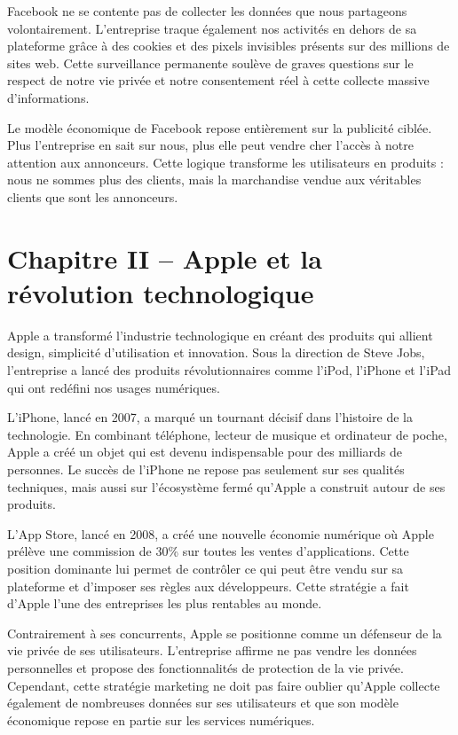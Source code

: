 \documentclass[12pt,a4paper]{article}
\begin{document}
Facebook ne se contente pas de collecter les données que nous partageons volontairement. L'entreprise traque également nos activités en dehors de sa plateforme grâce à des cookies et des pixels invisibles présents sur des millions de sites web. Cette surveillance permanente soulève de graves questions sur le respect de notre vie privée et notre consentement réel à cette collecte massive d'informations.

Le modèle économique de Facebook repose entièrement sur la publicité ciblée. Plus l'entreprise en sait sur nous, plus elle peut vendre cher l'accès à notre attention aux annonceurs. Cette logique transforme les utilisateurs en produits : nous ne sommes plus des clients, mais la marchandise vendue aux véritables clients que sont les annonceurs.

\newpage

\section*{Chapitre II -- Apple et la révolution technologique}

Apple a transformé l'industrie technologique en créant des produits qui allient design, simplicité d'utilisation et innovation. Sous la direction de Steve Jobs, l'entreprise a lancé des produits révolutionnaires comme l'iPod, l'iPhone et l'iPad qui ont redéfini nos usages numériques.

L'iPhone, lancé en 2007, a marqué un tournant décisif dans l'histoire de la technologie. En combinant téléphone, lecteur de musique et ordinateur de poche, Apple a créé un objet qui est devenu indispensable pour des milliards de personnes. Le succès de l'iPhone ne repose pas seulement sur ses qualités techniques, mais aussi sur l'écosystème fermé qu'Apple a construit autour de ses produits.

L'App Store, lancé en 2008, a créé une nouvelle économie numérique où Apple prélève une commission de 30\% sur toutes les ventes d'applications. Cette position dominante lui permet de contrôler ce qui peut être vendu sur sa plateforme et d'imposer ses règles aux développeurs. Cette stratégie a fait d'Apple l'une des entreprises les plus rentables au monde.

Contrairement à ses concurrents, Apple se positionne comme un défenseur de la vie privée de ses utilisateurs. L'entreprise affirme ne pas vendre les données personnelles et propose des fonctionnalités de protection de la vie privée. Cependant, cette stratégie marketing ne doit pas faire oublier qu'Apple collecte également de nombreuses données sur ses utilisateurs et que son modèle économique repose en partie sur les services numériques.
\end{document}
